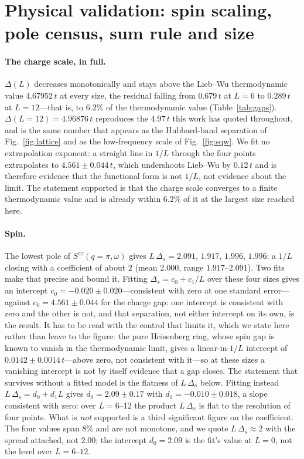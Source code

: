 \section{Physical validation: spin scaling, pole census, sum rule and size}
\label{sm:physics}

\paragraph{The charge scale, in full.} $\Delta(L)$ decreases monotonically and stays above the Lieb--Wu
thermodynamic value $4.67952\,t$ at every size, the residual falling from $0.679\,t$ at $L=6$ to $0.289\,t$ at
$L=12$---that is, to $6.2\%$ of the thermodynamic value (Table~\ref{tab:gaps}).
$\Delta(L=12)=4.96876\,t$ reproduces the $4.97\,t$ this work has quoted throughout, and is the same
number that appears as the Hubbard-band separation of Fig.~\ref{fig:lattice} and as the low-frequency
scale of Fig.~\ref{fig:sqw}. We fit no extrapolation exponent: a straight line in $1/L$ through the
four points extrapolates to $4.561\pm0.044\,t$, which undershoots Lieb--Wu by $0.12\,t$ and is
therefore evidence that the functional form is not $1/L$, not evidence about the limit. The statement
supported is that the charge scale converges to a finite thermodynamic value and is already within
$6.2\%$ of it at the largest size reached here.

\paragraph{Spin.} The lowest pole of $S^{zz}(q=\pi,\omega)$ gives $L\,\Delta_{s}=2.091$, $1.917$,
$1.996$, $1.996$: a $1/L$ closing with a coefficient of about $2$ (mean $2.000$, range $1.917$--$2.091$). Two fits make that precise and
bound it. Fitting $\Delta_{s}=c_0+c_1/L$ over these four sizes gives an intercept
$c_0=-0.020\pm0.020$---consistent with zero at one standard error---against
$c_0=4.561\pm0.044$ for the charge gap: one intercept is consistent with zero and the other is not,
and that separation, not either intercept on its own, is the result. It has to be read with the control
that limits it, which we state here rather than leave to the figure: the pure Heisenberg ring, whose
spin gap is known to vanish in the thermodynamic limit, gives a linear-in-$1/L$ intercept of
$0.0142\pm0.0014\,t$---above zero, not consistent with it---so at these sizes a vanishing intercept is
not by itself evidence that a gap closes. The statement that survives without a fitted model is the
flatness of $L\,\Delta_s$ below. Fitting instead $L\,\Delta_{s}=d_0+d_1L$
gives $d_0=2.09\pm0.17$ with $d_1=-0.010\pm0.018$, a slope consistent with zero: over $L=6$--$12$ the
product $L\,\Delta_s$ is flat to the resolution of four points. What is \emph{not} supported is a
third significant figure on the coefficient. The four values span $8\%$ and are not monotone, and we
quote $L\,\Delta_{s}\approx2$ with the spread attached, not $2.00$; the intercept $d_0=2.09$ is the fit's value at $L=0$, not the level over $L=6$--$12$.

